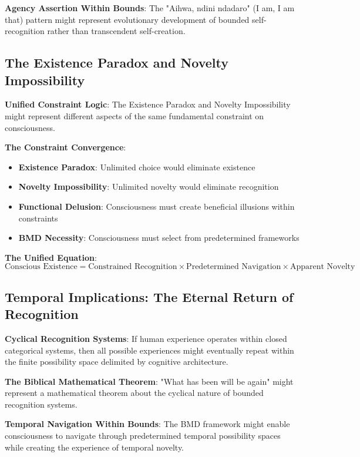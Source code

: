 \documentclass[12pt]{article}
\begin{document}
\textbf{Agency Assertion Within Bounds}: The "Aihwa, ndini ndadaro" (I am, I am that) pattern might represent evolutionary development of bounded self-recognition rather than transcendent self-creation.

\subsection{The Existence Paradox and Novelty Impossibility}

\textbf{Unified Constraint Logic}: The Existence Paradox and Novelty Impossibility might represent different aspects of the same fundamental constraint on consciousness.

\textbf{The Constraint Convergence}:
\begin{itemize}
\item \textbf{Existence Paradox}: Unlimited choice would eliminate existence
\item \textbf{Novelty Impossibility}: Unlimited novelty would eliminate recognition
\item \textbf{Functional Delusion}: Consciousness must create beneficial illusions within constraints
\item \textbf{BMD Necessity}: Consciousness must select from predetermined frameworks
\end{itemize}

\textbf{The Unified Equation}:
$$\text{Conscious Existence} = \text{Constrained Recognition} \times \text{Predetermined Navigation} \times \text{Apparent Novelty}$$

\subsection{Temporal Implications: The Eternal Return of Recognition}

\textbf{Cyclical Recognition Systems}: If human experience operates within closed categorical systems, then all possible experiences might eventually repeat within the finite possibility space delimited by cognitive architecture.

\textbf{The Biblical Mathematical Theorem}: "What has been will be again" might represent a mathematical theorem about the cyclical nature of bounded recognition systems.

\textbf{Temporal Navigation Within Bounds}: The BMD framework might enable consciousness to navigate through predetermined temporal possibility spaces while creating the experience of temporal novelty.
\end{document}
